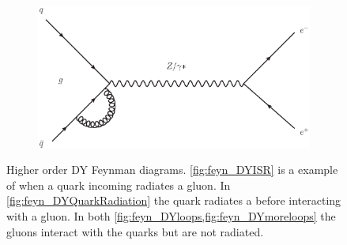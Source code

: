\begin{figure}[!p]
\begin{subfigure}[b]{\SideBySidePlotWidth}
        \caption{}
        \label{fig:feyn_DYloops}
    \end{subfigure}%
    \begin{subfigure}[b]{\SideBySidePlotWidth}
        \includegraphics[width=\linewidth]{figures/DYmoreloops.eps}
        \caption{}
        \label{fig:feyn_DYmoreloops}
    \end{subfigure}%

    \caption[
        Higher order DY Feynman diagrams.
    ]{
        Higher order DY Feynman diagrams. \cref{fig:feyn_DYISR} is a example of when a quark incoming radiates a gluon. In \cref{fig:feyn_DYQuarkRadiation} the quark radiates a \Z before interacting with a gluon. In both \cref{fig:feyn_DYloops,fig:feyn_DYmoreloops} the gluons interact with the quarks but are not radiated.
    }
    \label{fig:higher_order_z_diagrams}
\end{figure}